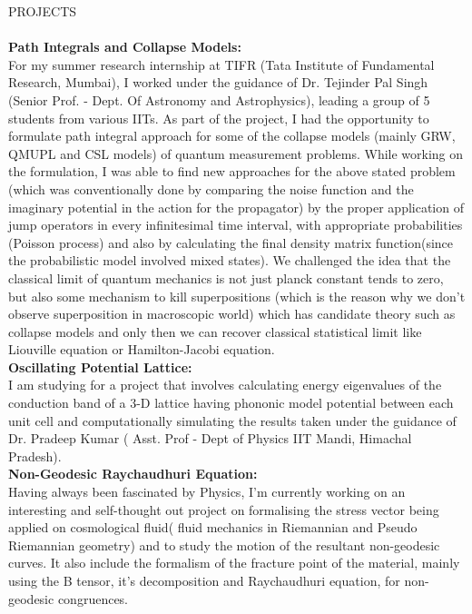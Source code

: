 \documentclass[a4paper]{article}
\newcommand{\lineunder} {
    \vspace*{-8pt} \\
    \hspace*{-18pt} \hrulefill \\
}
\newcommand{\header} [1] {
    {\hspace*{-18pt}\vspace*{6pt} \textsc{#1}}
    \vspace*{-6pt} \lineunder
}
\begin{document}
\header{PROJECTS}
\textbf{Path Integrals and Collapse Models: }\\
For my summer research internship at TIFR (Tata Institute of Fundamental Research, Mumbai), I worked under the guidance of Dr. Tejinder Pal Singh (Senior Prof. - Dept. Of Astronomy and Astrophysics), leading a group of 5 students from various IITs. As part of the project, I had the opportunity to formulate path integral approach for some of the collapse models (mainly GRW, QMUPL and CSL models) of quantum measurement problems. While working on the formulation, I was able to find new approaches for the above stated problem (which was conventionally done by comparing the noise function and the imaginary potential in the action for the propagator) by the proper application of jump operators in every infinitesimal time interval, with appropriate probabilities (Poisson process) and also by calculating the final density matrix function(since the probabilistic model involved mixed states). We challenged the idea that the classical limit of quantum mechanics is not just planck constant tends to zero, but also some mechanism to kill superpositions (which is the reason why we don’t observe superposition in macroscopic world) which has candidate theory such as collapse models and only then we can recover classical statistical limit like Liouville equation or Hamilton-Jacobi equation. \\
\vspace*{2mm}
\textbf{Oscillating Potential Lattice: } \\
I am studying for a project that involves calculating energy eigenvalues of the conduction band of a 3-D lattice having phononic model potential between each unit cell and computationally simulating the results taken under the guidance of Dr. Pradeep Kumar ( Asst. Prof - Dept of Physics IIT Mandi, Himachal Pradesh). \\
\vspace*{2mm}
\textbf{Non-Geodesic Raychaudhuri Equation: }\\
Having always been fascinated by Physics, I’m currently working on an interesting and self-thought out project on formalising the stress vector being applied on cosmological fluid( fluid mechanics in Riemannian and Pseudo Riemannian geometry) and to study the motion of the resultant non-geodesic curves. It also include the formalism of the fracture point of the material, mainly using the B tensor, it’s decomposition and Raychaudhuri equation, for non-geodesic congruences. \\
\end{document}
